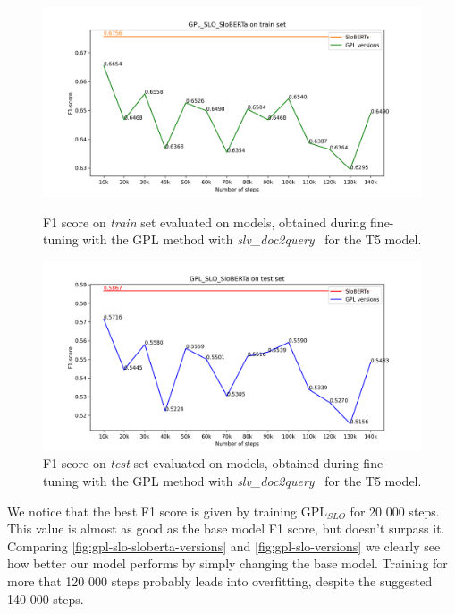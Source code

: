 \documentclass[fleqn,moreauthors,10pt]{ds_report}
\begin{document}
\begin{figure}
    \centering
    \begin{minipage}{0.5\textwidth}
        \centering
        \includegraphics[width=\linewidth]{GPL_SLO__SloBERTa_train.png}
        \caption{F1 score on \textit{train} set evaluated on models, obtained during fine-tuning with the GPL method with {\it slv\_doc2query}~\cite{boshko} for the T5 model.}
		\label{fig:gpl-sloberta-slo-versions-train}
    \end{minipage}\hfill
    \begin{minipage}{0.5\textwidth}
        \centering
        \includegraphics[width=\linewidth]{GPL_SLO__SloBERTa_test.png}
        \caption{F1 score on \textit{test} set evaluated on models, obtained during fine-tuning with the GPL method with {\it slv\_doc2query}~\cite{boshko} for the T5 model.}
		\label{fig:gpl-sloberta-slo-versions}
    \end{minipage}
\end{figure}


We notice that the best F1 score is given by training $\text{GPL}_{SLO}$ for 20 000 steps. This value is almost as good
as the base model F1 score, but doesn't surpass it. Comparing \ref*{fig:gpl-slo-sloberta-versions} and \ref*{fig:gpl-slo-versions}
we clearly see how better our model performs by simply changing the base model. Training for more that 120 000 steps probably
leads into overfitting, despite the suggested~\cite{GPL} 140 000 steps.
\end{document}

